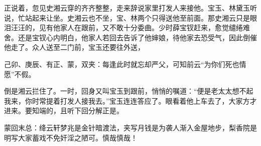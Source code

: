 \begin{parag}
    正说着，忽见史湘云穿的齐齐整整，走来辞说家里打发人来接他。宝玉、林黛玉听说，忙站起来让坐。史湘云也不坐，宝、林两个只得送他至前面。那史湘云只是眼泪汪汪的，见有他家人在跟前，又不敢十分委曲。少时薛宝钗赶来，愈觉缱绻难舍。还是宝钗心内明白，他家人若回去告诉了他婶娘，待他家去恐受气，因此倒催他走了。众人送至二门前，宝玉还要往外送，\begin{note}己卯、庚辰、有正、蒙，双夹：每逢此时就忘却严父，可知前云“为你们死也情愿”不假。\end{note}倒是湘云拦住了。一时，回身又叫宝玉到跟前，悄悄的嘱道：“便是老太太想不起我来，你时常提着打发人接我去。”宝玉连连答应了。眼看着他上车去了，大家方才进来。要知端的，且听下回分解正是。
\end{parag}


\begin{parag}
    \begin{note}蒙回末总：绛云轩梦兆是金针暗渡法，夹写月钱是为袭人渐入金屋地步，梨香院是明写大家蓄戏不免奸淫之陋可。慎哉慎哉！\end{note}
\end{parag}

